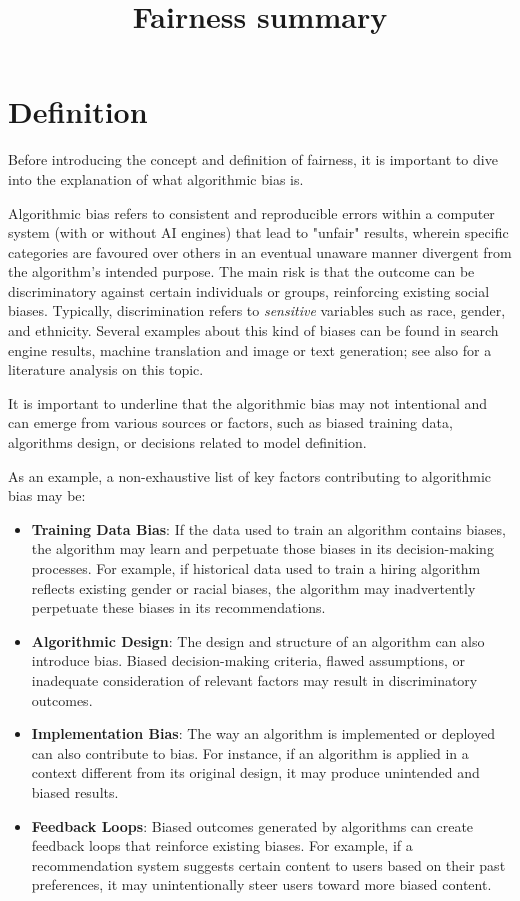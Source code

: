 \documentclass[12pt]{article}
\title{Fairness summary}
\date{}
\begin{document}
\maketitle

\section{Definition}

Before introducing the concept and definition of fairness, it is important to dive into the explanation of what algorithmic bias is.

Algorithmic bias refers to consistent and reproducible errors within a computer system (with or without AI engines) that lead to "unfair" results, wherein specific categories are favoured over others in an eventual unaware manner divergent from the algorithm's intended purpose. The main risk is that the outcome can be discriminatory against certain individuals or groups, reinforcing existing social biases. Typically, discrimination refers to \textit{sensitive} variables such as race, gender, and ethnicity. Several examples about this kind of biases can be found in search engine  results, machine translation and image or text generation; see also \cite{algBias} for a literature analysis on this topic.

It is important to underline that the algorithmic bias may not intentional and can emerge from various sources or factors, such as biased training data, algorithms design, or decisions related to model definition. 

As an example, a non-exhaustive list of key factors contributing to algorithmic bias may be:

\begin{itemize}
\item \textbf{Training Data Bias}: If the data used to train an algorithm contains biases, the algorithm may learn and perpetuate those biases in its decision-making processes. For example, if historical data used to train a hiring algorithm reflects existing gender or racial biases, the algorithm may inadvertently perpetuate these biases in its recommendations.

\item \textbf{Algorithmic Design}: The design and structure of an algorithm can also introduce bias. Biased decision-making criteria, flawed assumptions, or inadequate consideration of relevant factors may result in discriminatory outcomes.

\item \textbf{Implementation Bias}: The way an algorithm is implemented or deployed can also contribute to bias. For instance, if an algorithm is applied in a context different from its original design, it may produce unintended and biased results.

\item \textbf{Feedback Loops}: Biased outcomes generated by algorithms can create feedback loops that reinforce existing biases. For example, if a recommendation system suggests certain content to users based on their past preferences, it may unintentionally steer users toward more biased content.
\end{itemize}
\end{document}
